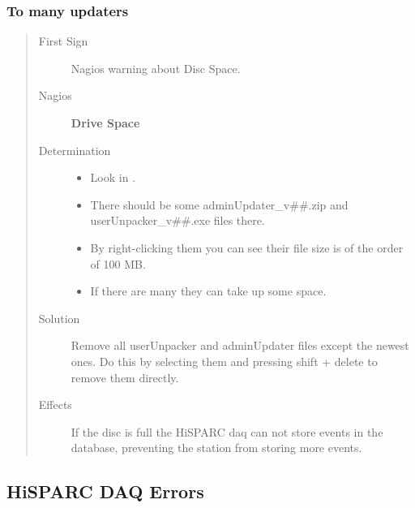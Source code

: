 \documentclass[a4paper,11pt,english]{sphinxmanual}
\begin{document}
\subsubsection{To many updaters}
\label{known-issues:to-many-updaters}\begin{quote}\begin{description}
\item[{First Sign}] \leavevmode
Nagios warning about Disc Space.

\item[{Nagios}] \leavevmode
\textbf{Drive Space}

\item[{Determination}] \leavevmode\begin{itemize}
\item {} 
Look in .

\item {} 
There should be some adminUpdater\_v\#\#.zip and userUnpacker\_v\#\#.exe files there.

\item {} 
By right-clicking them you can see their file size is of the order of 100 MB.

\item {} 
If there are many they can take up some space.

\end{itemize}

\item[{Solution}] \leavevmode
Remove all userUnpacker and adminUpdater files except the newest ones. Do this by selecting them and pressing shift + delete to remove them directly.

\item[{Effects}] \leavevmode
If the disc is full the HiSPARC daq can not store events in the database, preventing the station from storing more events.

\end{description}\end{quote}


\subsection{HiSPARC DAQ Errors}
\label{known-issues:hisparc-daq-errors}
\end{document}

